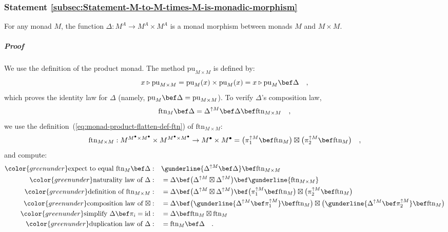 \subsubsection{Statement \label{subsec:Statement-M-to-M-times-M-is-monadic-morphism}\ref{subsec:Statement-M-to-M-times-M-is-monadic-morphism}}

For any monad $M$, the function $\Delta:M^{A}\rightarrow M^{A}\times M^{A}$
is a monad morphism between monads $M$ and $M\times M$.

\subparagraph{Proof}

We use the definition of the product monad. The method $\text{pu}_{M\times M}$
is defined by:
\[
x\triangleright\text{pu}_{M\times M}=\text{pu}_{M}(x)\times\text{pu}_{M}(x)=x\triangleright\text{pu}_{M}\bef\Delta\quad,
\]
which proves the identity law for $\Delta$ (namely, $\text{pu}_{M}\bef\Delta=\text{pu}_{M\times M}$).
To verify $\Delta$\textsf{'}s composition law, 
\[
\text{ftn}_{M}\bef\Delta=\Delta^{\uparrow M}\bef\Delta\bef\text{ftn}_{M\times M}\quad,
\]
we use the definition~(\ref{eq:monad-product-flatten-def-ftn}) of
$\text{ftn}_{M\times M}$:
\[
\text{ftn}_{M\times M}:M^{M^{\bullet}\times M^{\bullet}}\times M^{M^{\bullet}\times M^{\bullet}}\rightarrow M^{\bullet}\times M^{\bullet}=\big(\pi_{1}^{\uparrow M}\bef\text{ftn}_{M}\big)\boxtimes\big(\pi_{2}^{\uparrow M}\bef\text{ftn}_{M}\big)\quad,
\]
and compute:
\begin{align*}
{\color{greenunder}\text{expect to equal }\text{ftn}_{M}\bef\Delta:}\quad & \gunderline{\Delta^{\uparrow M}\bef\Delta}\bef\text{ftn}_{M\times M}\\
{\color{greenunder}\text{naturality law of }\Delta:}\quad & =\Delta\bef\big(\Delta^{\uparrow M}\boxtimes\Delta^{\uparrow M}\big)\bef\gunderline{\text{ftn}_{M\times M}}\\
{\color{greenunder}\text{definition of }\text{ftn}_{M\times M}:}\quad & =\Delta\bef\big(\Delta^{\uparrow M}\boxtimes\Delta^{\uparrow M}\big)\bef\big(\pi_{1}^{\uparrow M}\bef\text{ftn}_{M}\big)\boxtimes\big(\pi_{2}^{\uparrow M}\bef\text{ftn}_{M}\big)\\
{\color{greenunder}\text{composition law of }\boxtimes:}\quad & =\Delta\bef\big(\gunderline{\Delta^{\uparrow M}\bef\pi_{1}^{\uparrow M}}\bef\text{ftn}_{M}\big)\boxtimes\big(\gunderline{\Delta^{\uparrow M}\bef\pi_{2}^{\uparrow M}}\bef\text{ftn}_{M}\big)\\
{\color{greenunder}\text{simplify }\Delta\bef\pi_{i}=\text{id}:}\quad & =\Delta\bef\text{ftn}_{M}\boxtimes\text{ftn}_{M}\\
{\color{greenunder}\text{duplication law of }\Delta:}\quad & =\text{ftn}_{M}\bef\Delta\quad.
\end{align*}


